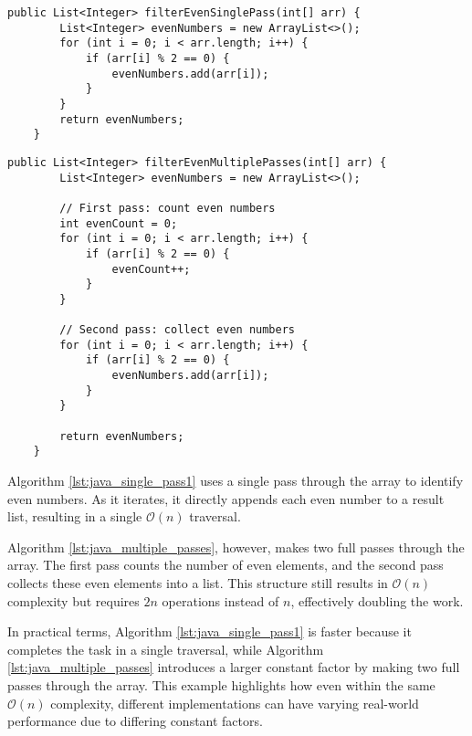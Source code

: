 \begin{lstlisting}[style=javaStyle, caption={Single pass to filter even numbers}, label={lst:java_single_pass1}]
    public List<Integer> filterEvenSinglePass(int[] arr) {
        List<Integer> evenNumbers = new ArrayList<>();
        for (int i = 0; i < arr.length; i++) {
            if (arr[i] % 2 == 0) {
                evenNumbers.add(arr[i]);
            }
        }
        return evenNumbers;
    }
\end{lstlisting}

\newpage

\begin{lstlisting}[style=javaStyle, caption={Multiple passes to filter even numbers}, label={lst:java_multiple_passes}]
    public List<Integer> filterEvenMultiplePasses(int[] arr) {
        List<Integer> evenNumbers = new ArrayList<>();

        // First pass: count even numbers
        int evenCount = 0;
        for (int i = 0; i < arr.length; i++) {
            if (arr[i] % 2 == 0) {
                evenCount++;
            }
        }

        // Second pass: collect even numbers
        for (int i = 0; i < arr.length; i++) {
            if (arr[i] % 2 == 0) {
                evenNumbers.add(arr[i]);
            }
        }

        return evenNumbers;
    }
\end{lstlisting}

Algorithm \ref{lst:java_single_pass1} uses a single pass through the array to identify even numbers. As it iterates, it directly appends each even number to a result list, resulting in a single $\mathcal{O}(n)$ traversal.

Algorithm \ref{lst:java_multiple_passes}, however, makes two full passes through the array. The first pass counts the number of even elements, and the second pass collects these even elements into a list. This structure still results in $\mathcal{O}(n)$ complexity but requires $2n$ operations instead of $n$, effectively doubling the work.

In practical terms, Algorithm \ref{lst:java_single_pass1} is faster because it completes the task in a single traversal, while Algorithm \ref{lst:java_multiple_passes} introduces a larger constant factor by making two full passes through the array. This example highlights how even within the same $\mathcal{O}(n)$ complexity, different implementations can have varying real-world performance due to differing constant factors.

